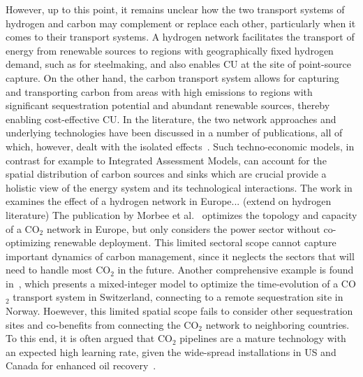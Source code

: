 \documentclass[twocolumn]{article}
\newcommand{\COtwo}{CO$_2$}
\begin{document}
However, up to this point, it remains unclear how the two transport systems of hydrogen and carbon may complement or replace each other, particularly when it comes to their transport systems. A hydrogen network facilitates the transport of energy from renewable sources to regions with geographically fixed hydrogen demand, such as for steelmaking, and also enables CU at the site of point-source capture. On the other hand, the carbon transport system allows for capturing and transporting carbon from areas with high emissions to regions with significant sequestration potential and abundant renewable sources, thereby enabling cost-effective CU.
In the literature, the two network approaches and underlying technologies have been discussed in a number of publications, all of which, however, dealt with the isolated effects~\cite{bakkenLinearModelsOptimization2008,morbeeOptimisedDeploymentEuropean2012,stewartFeasibilityEuropeanwideIntegrated2014,oeiModelingCarbonCapture2014,elahiMultiperiodLeastCost2014,burandtDecarbonizingChinaEnergy2019,middletonSimCCSOpensourceTool2020,bjerketvedtOptimalDesignCost2020,weiProposedGlobalLayout2021,damoreOptimalDesignEuropean2021,becattiniCarbonDioxideCapture2022}. Such techno-economic models, in contrast for example to Integrated Assessment Models, can account for the spatial distribution of carbon sources and sinks which are crucial provide a holistic view of the energy system and its technological interactions. The work in~\cite{neumannBenefitsHydrogenNetwork2022} examines the effect of a hydrogen network in Europe... (extend on hydrogen literature)
The publication by Morbee et al.~\cite{morbeeOptimisedDeploymentEuropean2012} optimizes the topology and capacity of a \COtwo{} network in Europe, but only considers the power sector without co-optimizing renewable deployment. This limited sectoral scope cannot capture important dynamics of carbon management, since it neglects the sectors that will need to handle most \COtwo{} in the future.
Another comprehensive example is found in~\cite{becattiniCarbonDioxideCapture2022}, which presents a mixed-integer model to optimize the time-evolution of a \COtwo{} transport system in Switzerland, connecting to a remote sequestration site in Norway. Hoewever, this limited spatial scope fails to consider other sequestration sites and co-benefits from connecting the \COtwo{} network to neighboring countries. To this end, it is often argued that \COtwo{} pipelines are a mature technology with an expected high learning rate, given the wide-spread installations in US and Canada for enhanced oil recovery~\cite{righettiSitingCarbonDioxide2017,friedmannNETZEROGEOSPHERICRETURN}.
\end{document}

